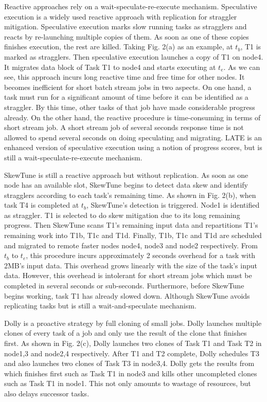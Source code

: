   Reactive approaches rely on a wait-speculate-re-execute mechanism. Speculative execution \cite{Dean2004} is a widely used reactive approach with replication for straggler mitigation. Speculative execution marks slow running tasks as stragglers and reacts by re-launching multiple copies of them. As soon as one of these copies finishes execution, the rest are killed. Taking Fig. 2(a) as an example, at $t_b$, T1 is marked as stragglers. Then speculative execution launches a copy of T1 on node4. It migrates data block of Task T1 to node4 and starts executing at $t_e$. As we can see, this approach incurs long reactive time and free time for other nodes. It becomes inefficient for short batch stream jobs in two aspects. On one hand, a task must run for a significant amount of time before it can be identified as a straggler. By this time, other tasks of that job have made considerable progress already. On the other hand, the reactive procedure is time-consuming in terms of short stream job. A short stream job of several seconds response time is not allowed to spend several seconds on doing speculating and migrating. LATE \cite{Zaharia2008} is an enhanced version of speculative execution using a notion of progress scores, but is still a wait-speculate-re-execute mechanism.

  SkewTune \cite{Kwon2012} is still a reactive approach but without replication. As soon as one node has an available slot, SkewTune begins to detect data skew and identify stragglers according to each task's remaining time. As shown in Fig. 2(b), when task T4 is completed at $t_b$, SkewTune's detection is triggered. Node1 is identified as straggler. T1 is selected to do skew mitigation due to its long remaining progress. Then SkewTune scans T1's remaining input data and repartitions T1's remaining work into T1b, T1c and T1d. Finally, T1b, T1c and T1d are scheduled and migrated to remote faster nodes node4, node3 and node2 respectively. From $t_b$ to $t_e$, this procedure incurs approximately 2 seconds overhead for a task with 2MB's input data. This overhead grows linearly with the size of the task's input data. However, this overhead is intolerant for short stream jobs which must be completed in several seconds or sub-seconds. Furthermore, before SkewTune begins working, task T1 has already slowed down. Although SkewTune avoids replicating tasks but is still a wait-and-speculate mechanism.

  Dolly \cite{Ananthanarayanan2013} is a proactive strategy by full cloning of small jobs. Dolly launches multiple clones of every task of a job and only use the result of the clone that finishes first. As shown in Fig. 2(c), Dolly launches two clones of Task T1 and Task T2 in node1,3 and node2,4 respectively. After T1 and T2 complete, Dolly schedules T3 and also launches two clones of Task T3 in node3,4. Dolly gets the results from which finishes first such as Task T1 in node3 and kills other uncompleted clones such as Task T1 in node1. This not only amounts to wastage of resources, but also delays successor tasks.

